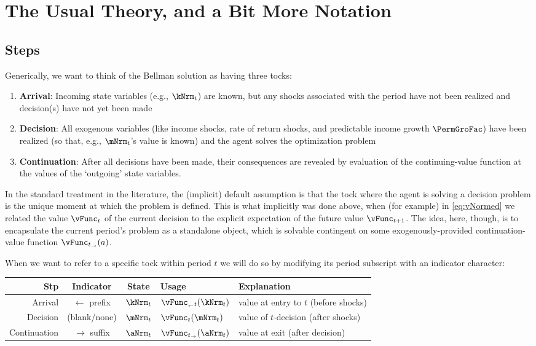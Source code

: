
\hypertarget{the-usual-theory}{}
\section{The Usual Theory, and a Bit More Notation}\label{sec:the-usual-theory}


\subsection{Steps}

Generically, we want to think of the Bellman solution as having three {tocks}:
\begin{enumerate}
\item \textbf{Arrival}: Incoming state variables (e.g., $\kNrm_{t}$) are known, but any shocks associated with the period have not been realized and decision(s) have not yet been made
\item \textbf{Decision}: All exogenous variables (like income shocks, rate of return shocks, and predictable income growth $\PermGroFac$) have been realized (so that, e.g., $\mNrm_{t}$'s value is known) and the agent solves the optimization problem
\item \textbf{Continuation}: After all decisions have been made, their consequences are revealed by evaluation of the continuing-value function at the values of the `outgoing' state variables.
\end{enumerate}

In the standard treatment in the literature, the (implicit) default assumption is that the {tock} where the agent is solving a decision problem is the unique moment at which the problem is defined.  This is what implicitly was done above, when (for example) in \eqref{eq:vNormed} we related the value $\vFunc_{t}$ of the current decision to the explicit expectation of the future value $\vFunc_{t+1}$.  The idea, here, though, is to encapsulate the current period's problem as a standalone object, which is solvable contingent on some exogenously-provided continuation-value function $\vFunc_{t_\rightarrow}({a})$.

When we want to refer to a specific {tock} within period $t$ we will do so by modifying its {period} subscript with an indicator character:
\begin{center}
    \begin{tabular}{r|c|c|l|l}
      Stp          & Indicator               & State          & Usage                       & Explanation                                \\ \hline
      {Arrival}      & ${\leftarrow}$ prefix & $\kNrm_{t}$ & $\vFunc_{_\leftarrow t}({\kNrm}_{t})$ & value at entry to $t$ (before shocks) \\
      {Decision}     & (blank/none)            & $\mNrm_{t}$ & $\vFunc_{{t}}({\mNrm}_{t})$ & value of $t$-decision (after shocks)       \\
      {Continuation} & ${\rightarrow}$ suffix & $\aNrm_{t}$ & $\vFunc_{t_\rightarrow}({\aNrm}_{t})$ & value at exit (after decision)
    \end{tabular}
\end{center}

